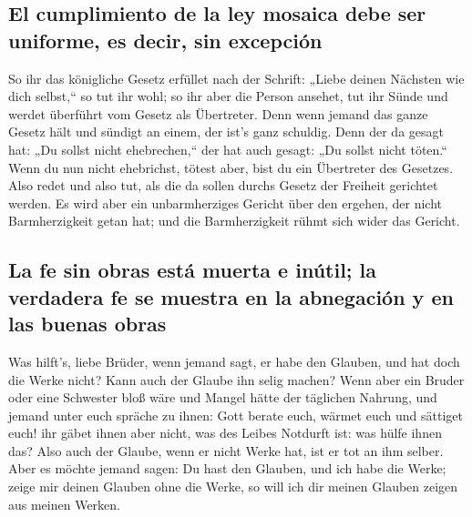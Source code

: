 \hypertarget{el-cumplimiento-de-la-ley-mosaica-debe-ser-uniforme-es-decir-sin-excepciuxf3n}{%
\subsection{El cumplimiento de la ley mosaica debe ser uniforme, es
decir, sin
excepción}\label{el-cumplimiento-de-la-ley-mosaica-debe-ser-uniforme-es-decir-sin-excepciuxf3n}}

 So ihr das königliche Gesetz erfüllet nach der Schrift:
„Liebe deinen Nächsten wie dich selbst,`` so tut ihr wohl;
 so ihr aber die Person ansehet, tut ihr Sünde und werdet
überführt vom Gesetz als Übertreter.  Denn wenn jemand
das ganze Gesetz hält und sündigt an einem, der ist's ganz schuldig.
 Denn der da gesagt hat: „Du sollst nicht ehebrechen,``
der hat auch gesagt: „Du sollst nicht töten.`` Wenn du nun nicht
ehebrichst, tötest aber, bist du ein Übertreter des Gesetzes.
 Also redet und also tut, als die da sollen durchs Gesetz
der Freiheit gerichtet werden.  Es wird aber ein
unbarmherziges Gericht über den ergehen, der nicht Barmherzigkeit getan
hat; und die Barmherzigkeit rühmt sich wider das Gericht.

\hypertarget{la-fe-sin-obras-estuxe1-muerta-e-inuxfatil-la-verdadera-fe-se-muestra-en-la-abnegaciuxf3n-y-en-las-buenas-obras}{%
\subsection{La fe sin obras está muerta e inútil; la verdadera fe se
muestra en la abnegación y en las buenas
obras}\label{la-fe-sin-obras-estuxe1-muerta-e-inuxfatil-la-verdadera-fe-se-muestra-en-la-abnegaciuxf3n-y-en-las-buenas-obras}}

 Was hilft's, liebe Brüder, wenn jemand sagt, er habe den
Glauben, und hat doch die Werke nicht? Kann auch der Glaube ihn selig
machen?  Wenn aber ein Bruder oder eine Schwester bloß
wäre und Mangel hätte der täglichen Nahrung,  und jemand
unter euch spräche zu ihnen: Gott berate euch, wärmet euch und sättiget
euch! ihr gäbet ihnen aber nicht, was des Leibes Notdurft ist: was hülfe
ihnen das?  Also auch der Glaube, wenn er nicht Werke
hat, ist er tot an ihm selber.  Aber es möchte jemand
sagen: Du hast den Glauben, und ich habe die Werke; zeige mir deinen
Glauben ohne die Werke, so will ich dir meinen Glauben zeigen aus meinen
Werken.

